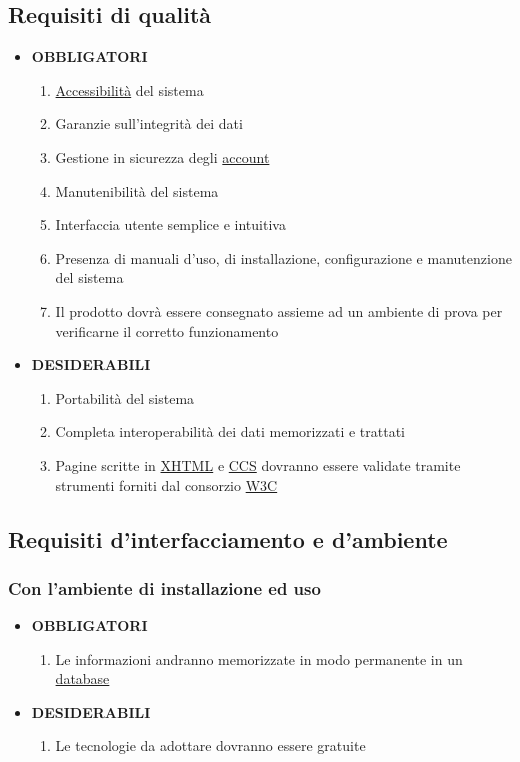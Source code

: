 \documentclass[11pt,a4paper]{article}
\begin{document}
\subsection{Requisiti di qualità}
\begin{itemize}
\item \textbf{OBBLIGATORI}
\begin{enumerate}
\item \underline{Accessibilità} del sistema
\item Garanzie sull'integrità dei dati
\item Gestione in sicurezza degli \underline{account}
\item Manutenibilità del sistema
\item Interfaccia utente semplice e intuitiva
\item Presenza di manuali d'uso, di installazione, configurazione e manutenzione del sistema
\item Il prodotto dovrà essere consegnato assieme ad un ambiente di prova per verificarne il corretto funzionamento
\end{enumerate}
\item \textbf{DESIDERABILI}
\begin{enumerate}
\item Portabilità del sistema
\item Completa interoperabilità dei dati memorizzati e trattati
\item Pagine scritte in \underline{XHTML} e \underline{CCS} dovranno essere validate tramite strumenti forniti dal consorzio \underline{W3C}
\end{enumerate}
\end{itemize}
\subsection{Requisiti d'interfacciamento e d'ambiente}
\subsubsection{Con l’ambiente di installazione ed uso}
\begin{itemize}
\item \textbf{OBBLIGATORI}
\begin{enumerate}
\item Le informazioni andranno memorizzate in modo permanente in un \underline{database}
\end{enumerate}
\item \textbf{DESIDERABILI}
\begin{enumerate}
\item Le tecnologie da adottare dovranno essere gratuite
\end{enumerate}
\end{itemize}
\end{document}
